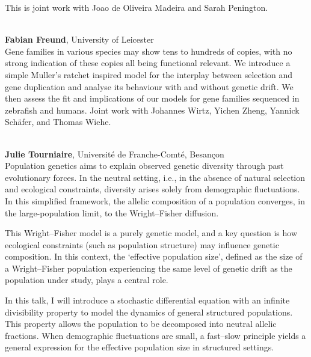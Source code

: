 \documentclass[12pt,a4paper]{article}
\begin{document}
 This is joint work with Joao de Oliveira Madeira and Sarah Penington. 

\bigskip\bigskip

\\[1ex]{ \large \textbf{ Fabian Freund}}, University of Leicester \\[2ex] Gene families in various species may show tens to hundreds of copies, with no strong indication of these copies all being functional relevant. We introduce a simple Muller's ratchet inspired model for the interplay between selection and gene duplication and analyse its behaviour with and without genetic drift. We then assess the fit and implications of our models for gene families sequenced in zebrafish and humans. Joint work with Johannes Wirtz, Yichen Zheng, Yannick Schäfer, and Thomas Wiehe. 

\bigskip\bigskip

\\[1ex]{ \large \textbf{ Julie Tourniaire}}, Université de Franche-Comté, Besançon \\[2ex] Population genetics aims to explain observed genetic diversity through past evolutionary forces. In the neutral setting, i.e., in the absence of natural selection and ecological constraints, diversity arises solely from demographic fluctuations. In this simplified framework, the allelic composition of a population converges, in the large-population limit, to the Wright–Fisher diffusion. 

 This Wright–Fisher model is a purely genetic model, and a key question is how ecological constraints (such as population structure) may influence genetic composition. In this context, the ‘effective population size’, defined as the size of a Wright–Fisher population experiencing the same level of genetic drift as the population under study, plays a central role. 

 In this talk, I will introduce a stochastic differential equation with an infinite divisibility property to model the dynamics of general structured populations. This property allows the population to be decomposed into neutral allelic fractions. When demographic fluctuations are small, a fast–slow principle yields a general expression for the effective population size in structured settings. 
\end{document}
